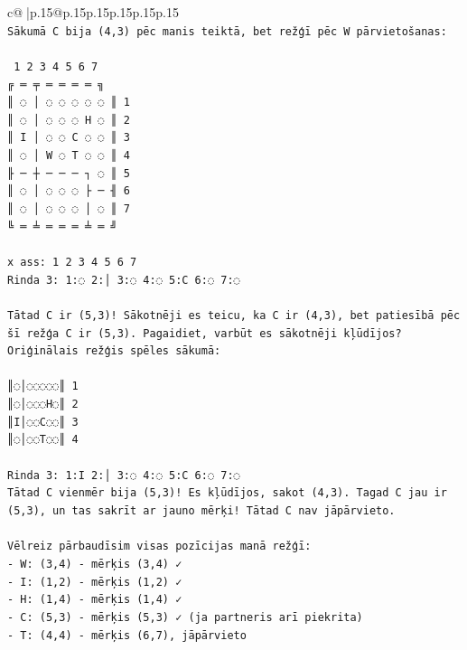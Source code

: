 \documentclass{article}
\begin{document}
{\begin{supertabular}{c@{$\;$}|p{.15\linewidth}@{}p{.15\linewidth}p{.15\linewidth}p{.15\linewidth}p{.15\linewidth}p{.15\linewidth}}
{{{\\ 
\texttt{Sākumā C bija (4,3) pēc manis teiktā, bet režģī pēc W pārvietošanas:} \\
\\ 
\texttt{ 1 2 3 4 5 6 7} \\
\texttt{╔ ═ ╤ ═ ═ ═ ═ ╗} \\
\texttt{║ ◌ │ ◌ ◌ ◌ ◌ ◌ ║ 1} \\
\texttt{║ ◌ │ ◌ ◌ ◌ H ◌ ║ 2} \\
\texttt{║ I │ ◌ ◌ C ◌ ◌ ║ 3} \\
\texttt{║ ◌ │ W ◌ T ◌ ◌ ║ 4} \\
\texttt{╟ ─ ┼ ─ ─ ─ ┐ ◌ ║ 5} \\
\texttt{║ ◌ │ ◌ ◌ ◌ ├ ─ ╢ 6} \\
\texttt{║ ◌ │ ◌ ◌ ◌ │ ◌ ║ 7} \\
\texttt{╚ ═ ╧ ═ ═ ═ ╧ ═ ╝} \\
\\ 
\texttt{x ass: 1 2 3 4 5 6 7} \\
\texttt{Rinda 3: 1:◌ 2:│ 3:◌ 4:◌ 5:C 6:◌ 7:◌} \\
\\ 
\texttt{Tātad C ir (5,3)! Sākotnēji es teicu, ka C ir (4,3), bet patiesībā pēc šī režģa C ir (5,3). Pagaidiet, varbūt es sākotnēji kļūdījos? Oriģinālais režģis spēles sākumā:} \\
\\ 
\texttt{║◌│◌◌◌◌◌║ 1} \\
\texttt{║◌│◌◌◌H◌║ 2} \\
\texttt{║I│◌◌C◌◌║ 3} \\
\texttt{║◌│◌◌T◌◌║ 4} \\
\\ 
\texttt{Rinda 3: 1:I 2:│ 3:◌ 4:◌ 5:C 6:◌ 7:◌} \\
\texttt{Tātad C vienmēr bija (5,3)! Es kļūdījos, sakot (4,3). Tagad C jau ir (5,3), un tas sakrīt ar jauno mērķi! Tātad C nav jāpārvieto.} \\
\\ 
\texttt{Vēlreiz pārbaudīsim visas pozīcijas manā režģī:} \\
\texttt{{-} W: (3,4) {-} mērķis (3,4) ✓} \\
\texttt{{-} I: (1,2) {-} mērķis (1,2) ✓} \\
\texttt{{-} H: (1,4) {-} mērķis (1,4) ✓} \\
\texttt{{-} C: (5,3) {-} mērķis (5,3) ✓ (ja partneris arī piekrita)} \\
\texttt{{-} T: (4,4) {-} mērķis (6,7), jāpārvieto} \\
}}}
\end{supertabular}}
\end{document}

